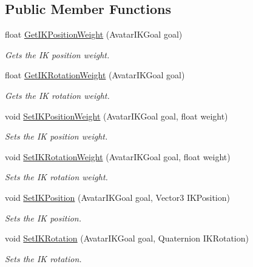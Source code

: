 \subsection*{Public Member Functions}
\begin{DoxyCompactItemize}
\item 
float \mbox{\hyperlink{class_root_motion_1_1_final_i_k_1_1_biped_i_k_a799c6c6550864c98a8b753d46ca253bf}{Get\+I\+K\+Position\+Weight}} (Avatar\+I\+K\+Goal goal)
\begin{DoxyCompactList}\small\item\em Gets the IK position weight. \end{DoxyCompactList}\item 
float \mbox{\hyperlink{class_root_motion_1_1_final_i_k_1_1_biped_i_k_a5af60ad5a14d883042613e6c0297ce6a}{Get\+I\+K\+Rotation\+Weight}} (Avatar\+I\+K\+Goal goal)
\begin{DoxyCompactList}\small\item\em Gets the IK rotation weight. \end{DoxyCompactList}\item 
void \mbox{\hyperlink{class_root_motion_1_1_final_i_k_1_1_biped_i_k_ab538d036986a562103396d59672296da}{Set\+I\+K\+Position\+Weight}} (Avatar\+I\+K\+Goal goal, float weight)
\begin{DoxyCompactList}\small\item\em Sets the IK position weight. \end{DoxyCompactList}\item 
void \mbox{\hyperlink{class_root_motion_1_1_final_i_k_1_1_biped_i_k_a1992eec40e5a9406c418aaaf181ada4e}{Set\+I\+K\+Rotation\+Weight}} (Avatar\+I\+K\+Goal goal, float weight)
\begin{DoxyCompactList}\small\item\em Sets the IK rotation weight. \end{DoxyCompactList}\item 
void \mbox{\hyperlink{class_root_motion_1_1_final_i_k_1_1_biped_i_k_afea423e263633adfafa19b2d117c98d2}{Set\+I\+K\+Position}} (Avatar\+I\+K\+Goal goal, Vector3 I\+K\+Position)
\begin{DoxyCompactList}\small\item\em Sets the IK position. \end{DoxyCompactList}\item 
void \mbox{\hyperlink{class_root_motion_1_1_final_i_k_1_1_biped_i_k_ab27d4e422159d71c0f4e4d2a239bc1eb}{Set\+I\+K\+Rotation}} (Avatar\+I\+K\+Goal goal, Quaternion I\+K\+Rotation)
\begin{DoxyCompactList}\small\item\em Sets the IK rotation. \end{DoxyCompactList}\item 

\end{DoxyCompactItemize}
